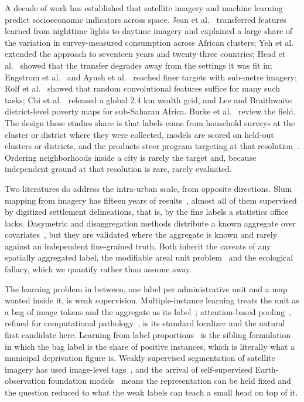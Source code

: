 \documentclass[11pt]{article}
\begin{document}
A decade of work has established that satellite imagery and machine learning predict
socioeconomic indicators across space. Jean et al.~\cite{jean2016} transferred features
learned from nighttime lights to daytime imagery and explained a large share of the
variation in survey-measured consumption across African clusters; Yeh et
al.~\cite{yeh2020} extended the approach to seventeen years and twenty-three countries;
Head et al.~\cite{head2017} showed that the transfer degrades away from the settings it
was fit in; Engstrom et al.~\cite{engstrom2022} and Ayush et al.~\cite{ayush2021} reached
finer targets with sub-metre imagery; Rolf et al.~\cite{rolf2021} showed that random
convolutional features suffice for many such tasks; Chi et al.~\cite{chi2022} released a
global 2.4 km wealth grid, and Lee and Braithwaite~\cite{lee2022} district-level poverty
maps for sub-Saharan Africa. Burke et al.~\cite{burke2021} review the field. The design
these studies share is that labels come from household surveys at the cluster or
district where they were collected, models are scored on held-out clusters or districts,
and the products steer program targeting at that resolution~\cite{aiken2022}. Ordering
neighborhoods inside a city is rarely the target and, because independent ground at
that resolution is rare, rarely evaluated.

Two literatures do address the intra-urban scale, from opposite directions. Slum mapping
from imagery has fifteen years of results~\cite{kuffer2016}, almost all of them
supervised by digitized settlement delineations, that is, by the fine labels a
statistics office lacks. Dasymetric and disaggregation methods distribute a known
aggregate over covariates~\cite{stevens2015,wardrop2018}, but they are validated where
the aggregate is known and rarely against an independent fine-grained truth. Both
inherit the caveats of any spatially aggregated label, the modifiable areal unit
problem~\cite{openshaw1984} and the ecological fallacy, which we quantify rather than
assume away.

The learning problem in between, one label per administrative unit and a map wanted
inside it, is weak supervision. Multiple-instance learning treats the unit as a bag of
image tokens and the aggregate as its label~\cite{carbonneau2018}; attention-based
pooling~\cite{ilse2018}, refined for computational pathology~\cite{lu2021}, is its
standard localizer and the natural first candidate here. Learning from label
proportions~\cite{quadrianto2009,yu2013,ardehaly2017,dulac2019} is the sibling
formulation in which the bag label is the share of positive instances, which is
literally what a municipal deprivation figure is. Weakly supervised segmentation of
satellite imagery has used image-level tags~\cite{wang2020}, and the arrival of
self-supervised Earth-observation foundation models~\cite{cong2022,wang2023,xiong2024}
means the representation can be held fixed and the question reduced to what the weak
labels can teach a small head on top of it.
\end{document}
